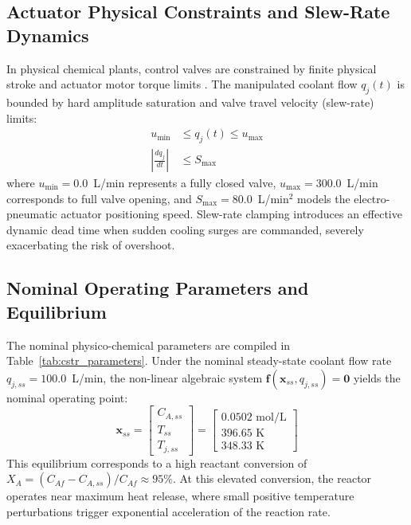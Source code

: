 \subsection{Actuator Physical Constraints and Slew-Rate Dynamics}
In physical chemical plants, control valves are constrained by finite physical stroke and actuator motor torque limits \cite{hippe2006windup, tarbouriech2009antiwindup}. The manipulated coolant flow $q_j(t)$ is bounded by hard amplitude saturation and valve travel velocity (slew-rate) limits:
\begin{align}
    u_{\min} &\le q_j(t) \le u_{\max} \label{eq:actuator_amplitude} \\
    \left|\frac{dq_j}{dt}\right| &\le S_{\max} \label{eq:actuator_slew}
\end{align}
where $u_{\min} = 0.0$~L/min represents a fully closed valve, $u_{\max} = 300.0$~L/min corresponds to full valve opening, and $S_{\max} = 80.0$~L/min$^2$ models the electro-pneumatic actuator positioning speed. Slew-rate clamping introduces an effective dynamic dead time when sudden cooling surges are commanded, severely exacerbating the risk of overshoot.

\subsection{Nominal Operating Parameters and Equilibrium}
The nominal physico-chemical parameters are compiled in Table~\ref{tab:cstr_parameters}. Under the nominal steady-state coolant flow rate $q_{j,ss} = 100.0$~L/min, the non-linear algebraic system $\mathbf{f}(\mathbf{x}_{ss}, q_{j,ss}) = \mathbf{0}$ yields the nominal operating point:
\begin{equation}
    \mathbf{x}_{ss} = \begin{bmatrix} C_{A,ss} \\ T_{ss} \\ T_{j,ss} \end{bmatrix} = \begin{bmatrix} 0.0502\text{ mol/L} \\ 396.65\text{ K} \\ 348.33\text{ K} \end{bmatrix}
    \label{eq:nominal_ss}
\end{equation}
This equilibrium corresponds to a high reactant conversion of $X_A = (C_{Af} - C_{A,ss})/C_{Af} \approx 95\%$. At this elevated conversion, the reactor operates near maximum heat release, where small positive temperature perturbations trigger exponential acceleration of the reaction rate.

